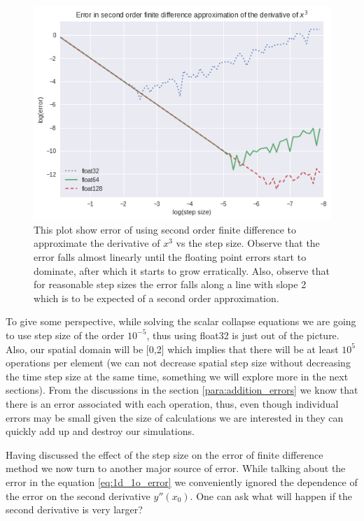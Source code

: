 \begin{figure}[hbt!]
    \centering
    \includegraphics[width=\textwidth]{images/x^3_error_order2.png}
    \caption[Error in the approximation of the derivative of $x^3$ by second order finite difference methods.]{This plot show error of using second order finite difference to approximate the derivative of $x^3$ vs the step size. Observe that the error falls almost linearly until the floating point errors start to dominate, after which it starts to grow erratically. Also, observe that for reasonable step sizes the error falls along a line with slope 2 which is to be expected of a second order approximation. }\label{fig:x^3_error_order2}
\end{figure}


To give some perspective, while solving the scalar collapse equations we are going to use step size of the order $10^{-5}$, thus using float32 is just out of the picture. Also, our spatial domain will be [0,2] which implies that there will be at least $10^{5}$ operations per element (we can not decrease spatial step size without decreasing the time step size at the same time, something we will explore more in the next sections). From the discussions in the section \ref{para:addition_errors} we know that there is an error associated with each operation, thus, even though individual errors may be small given the size of calculations we are interested in they can quickly add up and destroy our simulations.





Having discussed the effect of the step size on the error of finite difference method we now turn to another major source of error. While talking about the error in the equation \ref{eq:1d_1o_error} we conveniently ignored the dependence of the error on the second derivative $y''(x_0)$. One can ask what will happen if the second derivative is very larger?

